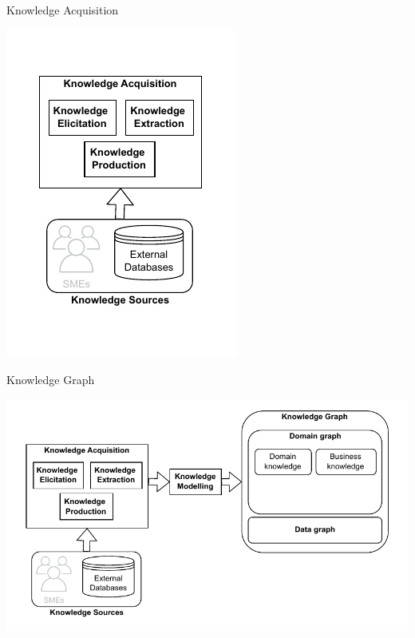 \begin{frame}{Knowledge Acquisition}

        \begin{center}
            \includegraphics[scale=0.9]{images/KGBS-knowledge-acquisition.pdf} 
        \end{center}

\end{frame}




\begin{frame}{Knowledge Graph}

        \begin{center}
            \includegraphics[scale=0.7]{images/KGBS-knowledge-modelling-kg.pdf} 
        \end{center}

\end{frame}

